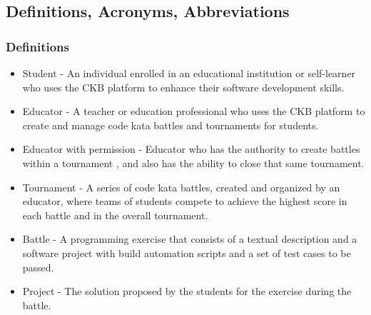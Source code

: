 \subsection{Definitions, Acronyms, Abbreviations}

\subsubsection{Definitions}
\begin{itemize}
\item Student - An individual enrolled in an educational institution or self-learner who uses the CKB platform to enhance their software development skills.
    \item Educator - A teacher or education professional who uses the CKB platform to create and manage code kata battles and tournaments for students.
    \item Educator with permission - Educator who has the authority to create battles within a tournament , and also has the ability to close that same tournament. 
    \item Tournament - A series of code kata battles, created and organized by an educator, where teams of students compete to achieve the highest score in each battle and in the overall tournament.
    
    \item Battle - A programming exercise that consists of a textual description and a software project with build automation scripts and a set of test cases to be passed.

    \item Project - The solution proposed by the students for the exercise during the battle.
    

\end{itemize}
